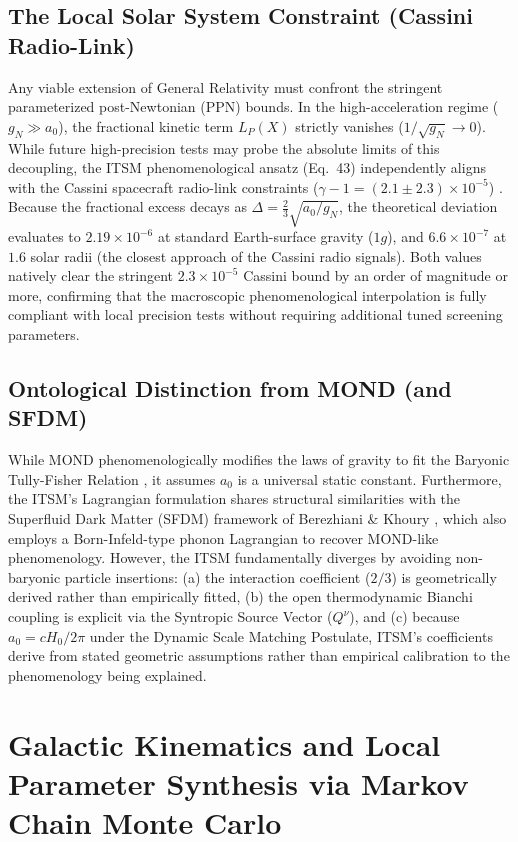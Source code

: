\documentclass[aps,prd,10pt,twocolumn,superscriptaddress,nofootinbib,floatfix]{revtex4-2}
\begin{document}
\subsection{The Local Solar System Constraint (Cassini Radio-Link)}
Any viable extension of General Relativity must confront the stringent parameterized post-Newtonian (PPN) bounds. In the high-acceleration regime ($g_N \gg a_0$), the fractional kinetic term $L_P(X)$ strictly vanishes ($1/\sqrt{g_N} \to 0$). While future high-precision tests may probe the absolute limits of this decoupling, the ITSM phenomenological ansatz (Eq.~43) independently aligns with the Cassini spacecraft radio-link constraints ($\gamma - 1 = (2.1 \pm 2.3) \times 10^{-5}$) \cite{cassini}. Because the fractional excess decays as $\Delta = \frac{2}{3} \sqrt{a_0 / g_N}$, the theoretical deviation evaluates to $2.19 \times 10^{-6}$ at standard Earth-surface gravity ($1g$), and $6.6 \times 10^{-7}$ at $1.6$ solar radii (the closest approach of the Cassini radio signals). Both values natively clear the stringent $2.3 \times 10^{-5}$ Cassini bound by an order of magnitude or more, confirming that the macroscopic phenomenological interpolation is fully compliant with local precision tests without requiring additional tuned screening parameters.

\subsection{Ontological Distinction from MOND (and SFDM)}
While MOND phenomenologically modifies the laws of gravity to fit the Baryonic Tully-Fisher Relation \cite{mond}, it assumes $a_0$ is a universal static constant. Furthermore, the ITSM's Lagrangian formulation shares structural similarities with the Superfluid Dark Matter (SFDM) framework of Berezhiani \& Khoury \cite{sf_dm}, which also employs a Born-Infeld-type phonon Lagrangian to recover MOND-like phenomenology. However, the ITSM fundamentally diverges by avoiding non-baryonic particle insertions: (a) the interaction coefficient ($2/3$) is geometrically derived rather than empirically fitted, (b) the open thermodynamic Bianchi coupling is explicit via the Syntropic Source Vector ($Q^\nu$), and (c) because $a_0 = c H_0 / 2\pi$ under the Dynamic Scale Matching Postulate, ITSM's coefficients derive from stated geometric assumptions rather than empirical calibration to the phenomenology being explained.

\section{\label{sec:kinematics}Galactic Kinematics and Local Parameter Synthesis via Markov Chain Monte Carlo}
\end{document}
